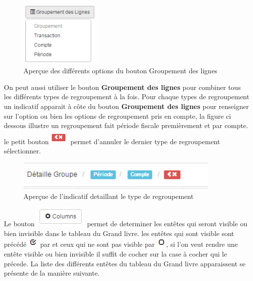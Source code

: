 \documentclass[12pt,a4paper]{report}
\begin{document}
\begin{figure}[h]
\begin{center}
\includegraphics[width=4cm]{pic/MenuRegroupement.png}
\end{center}
\caption{Aperçue des différents options du bouton Groupement des lignes}
\label{Aperçue des différents options du bouton Grouper des lignes}
\end{figure}

On peut aussi utiliser le bouton \textbf{Groupement des lignes} pour combiner tous les différents types de regroupement à la fois. Pour chaque types de regroupement un indicatif apparait à côte du bouton \textbf{Groupement des lignes} pour renseigner sur l'option ou bien les options de regroupement pris en compte, la figure ci dessous illustre un regroupement fait période fiscale premièrement et par compte. le petit bouton \includegraphics[scale=0.7]{pic/RedBack.png} permet d'annuler le dernier type de regroupement sélectionner. 

\begin{figure}[h]
\begin{center}
\includegraphics[width=10cm]{pic/DetailleGroupeOption.png}
\end{center}
\caption{Aperçue de l'indicatif detaillant le type de regroupement}
\label{Aperçue de l'indicatif detaillant le type de regroupement}
\end{figure}



Le bouton  \includegraphics[scale=0.7]{pic/ColumnsLedger.png} permet de determiner les entêtes qui seront visible ou bien invisible dans le tableau du Grand livre. les entêtes qui sont visible sont précédé \includegraphics[scale=0.7]{pic/Checked.png} par et ceux qui ne sont pas visible par \includegraphics[scale=0.7]{pic/Unchecked.png}, si l'on veut rendre une entête visible ou bien invisible il suffit de cocher sur la case à cocher qui le précede. La liste des différents entêtes du tableau du Grand livre apparaissent se présente de la manière suivante.
\end{document}
